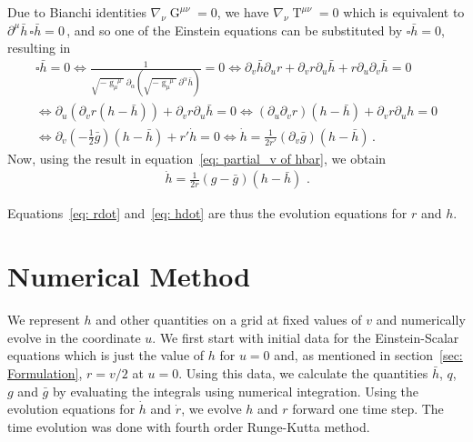 \documentclass[11pt]{article}
\newcommand{\mathcolorbox}[2]{\colorbox{#1}{$\displaystyle #2$}}
\DeclareMathOperator{\g}{g}
\DeclareMathOperator{\G}{G}
\DeclareMathOperator{\T}{T}
\begin{document}
Due to Bianchi identities $\nabla_\nu\G^{\mu\nu} = 0$, we have $\nabla_\nu\T^{\mu\nu} = 0$ which is equivalent to $\partial^\mu\bar{h}\,\square\bar{h}=0\,$,
and so one of the Einstein equations can be substituted by $\square \bar{h}= 0$, resulting in
\begin{gather*}
    \square \bar{h}= 0 \Leftrightarrow \frac{1}{\sqrt{-\g_\mu^{\;\;\mu}}\,\partial_\alpha(\sqrt{-\g_\mu^{\;\;\mu}}\,\partial^\alpha\bar{h})} = 0 \Leftrightarrow \partial_v\bar{h}\partial_u r + \partial_v r \partial_u\bar{h} + r\partial_u\partial_v\bar{h} = 0\\
    \Leftrightarrow \partial_u(\partial_v r(h-\bar{h})) + \partial_v r \partial_u \bar{h} = 0\Leftrightarrow (\partial_u\partial_v r)(h-\bar{h}) + \partial_v r\partial_u h = 0\\
    \Leftrightarrow \partial_v(-\frac{1}{2} \bar{g})(h-\bar{h}) + r'\dot h=0 \Leftrightarrow \dot h = \frac{1}{2r'}(\partial_v \bar g)(h-\bar{h})\, .
\end{gather*}
Now, using the result in equation~\eqref{eq: partial_v of hbar}, we obtain
\begin{align}
    \boxed{\,\dot h = \frac{1}{2r}(g - \bar g)(h-\bar{h})\,}\, .
    \label{eq: hdot}
\end{align}

Equations~\eqref{eq: rdot} and~\eqref{eq: hdot} are thus the evolution equations for $r$ and $h$.

\section{Numerical Method}

We represent $h$ and other quantities on a grid at fixed values of $v$ and numerically evolve in the coordinate $u$.
We first start with initial data for the Einstein-Scalar equations which is just the value of $h$ for $u=0$ and, as mentioned in section~\ref{sec: Formulation}, $r=v/2$ at $u=0$. Using this data, we calculate the quantities $\bar h$, $q$, $g$ and $\bar g$ by evaluating the integrals using numerical integration. Using the evolution equations for $\dot h$ and $\dot r$, we evolve $h$ and $r$ forward one time step. The time evolution was done with fourth order Runge-Kutta method.
\end{document}
